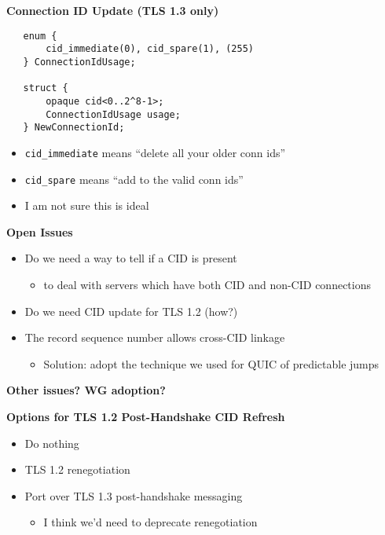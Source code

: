 \documentclass[helvetica]{seminar}
\newcommand{\heading}[1]{%
  \begin{center} 
    \large\bf 
    #1 
  \end{center} 
  \vspace{.4 in}}
\begin{document}
\begin{slide}
  \heading{Connection ID Update (TLS 1.3 only)}

\begin{verbatim}
   enum {
       cid_immediate(0), cid_spare(1), (255)
   } ConnectionIdUsage;

   struct {
       opaque cid<0..2^8-1>;
       ConnectionIdUsage usage;
   } NewConnectionId;
\end{verbatim}

  \begin{itemize}
    \item \verb^cid_immediate^ means ``delete all your older conn ids''
    \item \verb^cid_spare^ means ``add to the valid conn ids''
    \item I am not sure this is ideal
  \end{itemize}

\end{slide}


\begin{slide}
  \heading{Open Issues}

  \begin{itemize}
  \item Do we need a way to tell if a CID is present
    \begin{itemize}
    \item to deal with servers which have both CID and non-CID connections
    \end{itemize}
  \item Do we need CID update for TLS 1.2 (how?)
  \item The record sequence number allows cross-CID linkage
    \begin{itemize}
    \item Solution: adopt the technique we used for QUIC of predictable jumps
    \end{itemize}
  \end{itemize}
\end{slide}


\begin{slide}
\heading{Other issues? WG adoption?}

\end{slide}


\begin{slide}
  \heading{Options for TLS 1.2 Post-Handshake CID Refresh}

  \begin{itemize}
  \item Do nothing
  \item TLS 1.2 renegotiation
  \item Port over TLS 1.3 post-handshake messaging
    \begin{itemize}
    \item I think we'd need to deprecate renegotiation
    \end{itemize}
  \end{itemize}

\end{slide}
\end{document}
